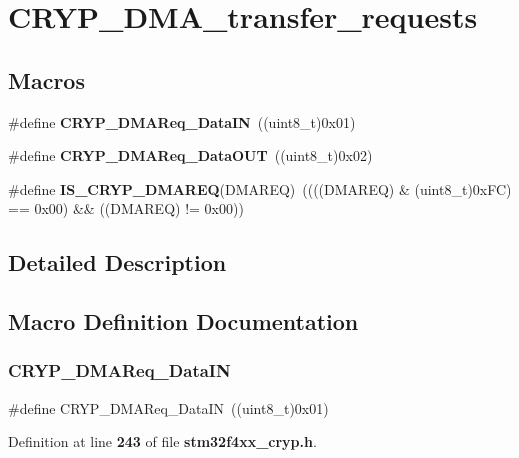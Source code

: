 \section{C\+R\+Y\+P\+\_\+\+D\+M\+A\+\_\+transfer\+\_\+requests}
\label{group__CRYP__DMA__transfer__requests}
\subsection*{Macros}
\begin{DoxyCompactItemize}
\item 
\#define \textbf{ C\+R\+Y\+P\+\_\+\+D\+M\+A\+Req\+\_\+\+Data\+IN}~((uint8\+\_\+t)0x01)
\item 
\#define \textbf{ C\+R\+Y\+P\+\_\+\+D\+M\+A\+Req\+\_\+\+Data\+O\+UT}~((uint8\+\_\+t)0x02)
\item 
\#define \textbf{ I\+S\+\_\+\+C\+R\+Y\+P\+\_\+\+D\+M\+A\+R\+EQ}(D\+M\+A\+R\+EQ)~((((D\+M\+A\+R\+EQ) \& (uint8\+\_\+t)0x\+F\+C) == 0x00) \&\& ((\+D\+M\+A\+R\+E\+Q) != 0x00))
\end{DoxyCompactItemize}


\subsection{Detailed Description}


\subsection{Macro Definition Documentation}
\mbox{\label{group__CRYP__DMA__transfer__requests_gae524983ae7dc12d0f91e73bac4dda8e9}} 
\subsubsection{C\+R\+Y\+P\+\_\+\+D\+M\+A\+Req\+\_\+\+Data\+IN}
{\footnotesize\ttfamily \#define C\+R\+Y\+P\+\_\+\+D\+M\+A\+Req\+\_\+\+Data\+IN~((uint8\+\_\+t)0x01)}



Definition at line \textbf{ 243} of file \textbf{ stm32f4xx\+\_\+cryp.\+h}.

